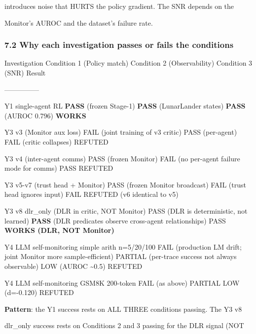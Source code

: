 \documentclass[
]{article}
\begin{document}
introduces noise that HURTS the policy gradient. The SNR depends on the

Monitor's AUROC and the dataset's failure rate.

\subsubsection{7.2 Why each investigation passes or fails the
conditions}\label{why-each-investigation-passes-or-fails-the-conditions}

Investigation \textbar{} Condition 1 (Policy match) \textbar{} Condition
2 (Observability) \textbar{} Condition 3 (SNR) \textbar{} Result
\textbar{}

\textbar---\textbar---\textbar---\textbar---\textbar---\textbar{}

Y1 single-agent RL \textbar{} \textbf{PASS} (frozen Stage-1) \textbar{}
\textbf{PASS} (LunarLander states) \textbar{} \textbf{PASS} (AUROC
0.796) \textbar{} \textbf{WORKS} \textbar{}

Y3 v3 (Monitor aux loss) \textbar{} FAIL (joint training of v3 critic)
\textbar{} PASS (per-agent) \textbar{} FAIL (critic collapses)
\textbar{} REFUTED \textbar{}

Y3 v4 (inter-agent comms) \textbar{} PASS (frozen Monitor) \textbar{}
FAIL (no per-agent failure mode for comms) \textbar{} PASS \textbar{}
REFUTED \textbar{}

Y3 v5-v7 (trust head + Monitor) \textbar{} PASS (frozen Monitor
broadcast) \textbar{} FAIL (trust head ignores input) \textbar{} FAIL
\textbar{} REFUTED (v6 identical to v5) \textbar{}

Y3 v8 dlr\_only (DLR in critic, NOT Monitor) \textbar{} PASS (DLR is
deterministic, not learned) \textbar{} \textbf{PASS} (DLR predicates
observe cross-agent relationships) \textbar{} PASS \textbar{}
\textbf{WORKS (DLR, NOT Monitor)} \textbar{}

Y4 LLM self-monitoring simple arith n=5/20/100 \textbar{} FAIL
(production LM drift; joint Monitor more sample-efficient) \textbar{}
PARTIAL (per-trace success not always observable) \textbar{} LOW (AUROC
\textasciitilde0.5) \textbar{} REFUTED \textbar{}

Y4 LLM self-monitoring GSM8K 200-token \textbar{} FAIL (as above)
\textbar{} PARTIAL \textbar{} LOW (d=-0.120) \textbar{} REFUTED
\textbar{}

\textbf{Pattern}: the Y1 success rests on ALL THREE conditions passing.
The Y3 v8

dlr\_only success rests on Conditions 2 and 3 passing for the DLR signal
(NOT
\end{document}
